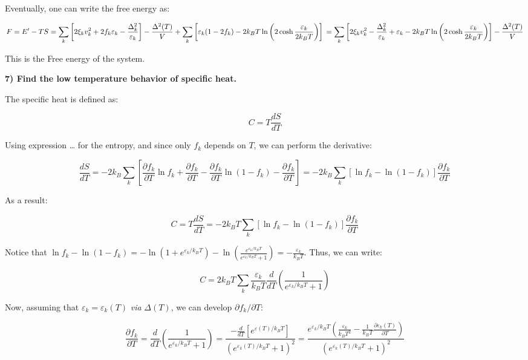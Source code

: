Eventually, one can write the free energy as:

\[ F = E' - TS \\ = \sum_k \left[2\xi_k v_k^2 + 2f_k \varepsilon_k - \frac{\Delta_k^2}{\varepsilon_k} \right] - \frac{\Delta^2(T)}{V} + \sum_k \left[\varepsilon_k (1 - 2 f_k) - 2 k_B T \ln \left(2 \cosh \frac{\varepsilon_k}{2 k_B T}\right) \right] \\ = \sum_k \left[2\xi_k v_k^2 - \frac{\Delta_k^2}{\varepsilon_k} + \varepsilon_k - 2 k_B T \ln \left(2 \cosh \frac{\varepsilon_k}{2 k_B T}\right)\right]-\frac{\Delta^2(T)}{V}\]

This is the Free energy of the system.

\textbf{7) Find the low temperature behavior of specific heat.}

The specific heat is defined as:

\[ C = T \frac{d S}{d T}\]

Using expression \ldots{} for the entropy, and since only \(f_k\)
depends on \(T\), we can perform the derivative:

\[ \frac{dS}{dT} = -2 k_B \sum_k \left[\frac{\partial f_k}{\partial T} \ln f_k + \frac{\partial f_k}{\partial T} - \frac{\partial f_k}{\partial T} \ln(1 - f_k) - \frac{\partial f_k}{\partial T} \right] = - 2 k_B \sum_k \left[\ln f_k - \ln(1 - f_k) \right]\frac{\partial f_k}{\partial T}\]

As a result:

\[ C = T \frac{dS}{dT} = -2 k_B T \sum_k \left[\ln f_k - \ln(1-f_k) \right]\frac{\partial f_k}{\partial T}\]

Notice that
\(\ln f_k - \ln(1-f_k) = -\ln(1+e^{\varepsilon_k/k_B T}) - \ln \left(\frac{e^{\varepsilon_k/k_B T}}{e^{\varepsilon_k/k_B T}+1} \right) = -\frac{\varepsilon_k}{k_B T}\).
Thus, we can write:

\[C = 2 k_B T \sum_k \frac{\varepsilon_k}{k_B T} \frac{d}{dT}\left(\frac{1}{e^{\varepsilon_k/k_B T}+1}\right) \]

Now, assuming that \(\varepsilon_k = \varepsilon_k(T)\) \emph{via}
\(\Delta(T)\), we can develop \(\partial f_k / \partial T\):

\[ \frac{\partial f_k}{\partial T} = \frac{d}{dT} \left(\frac{1}{e^{\varepsilon_k/k_B T}+1}\right) = \frac{-\frac{d}{dT}[e^{\varepsilon(T)/k_B T}]}{(e^{\varepsilon_k(T)/k_B T}+1)^2}
= \frac{e^{\varepsilon_k/k_BT}\left(\frac{\varepsilon_k}{k_B T^2} - \frac{1}{k_B T}\frac{\partial \varepsilon_k(T)}{\partial T}\right)}{(e^{\varepsilon_k(T)/k_B T}+1)^2} \]

